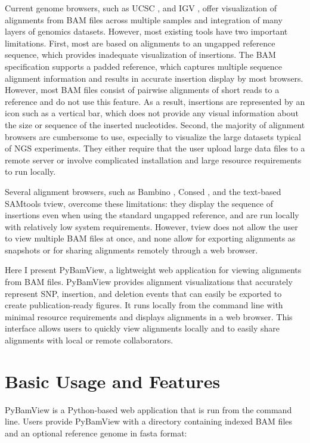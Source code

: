 Current genome browsers, such as UCSC \cite{Kent2002}, and IGV \cite{RobinsonThorvaldsdottirWincklerEtAl2011}, offer visualization of alignments from BAM files across multiple samples and integration of many layers of genomics datasets. However, most existing tools have two important limitations. First, most are based on alignments to an ungapped reference sequence, which provides inadequate visualization of insertions. The BAM specification supports a padded reference, which captures multiple sequence alignment information and results in accurate insertion display by most browsers. However, most BAM files consist of pairwise alignments of short reads to a reference and do not use this feature. As a result, insertions are represented by an icon such as a vertical bar, which does not provide any visual information about the size or sequence of the inserted nucleotides. Second, the majority of alignment browsers are cumbersome to use, especially to visualize the large datasets typical of NGS experiments. They either require that the user upload large data files to a remote server or involve complicated installation and large resource requirements to run locally. 

Several alignment browsers, such as Bambino \cite{EdmonsonZhangYanEtAl2011}, Consed \cite{GordonGreen2013}, and the text-based SAMtools \cite{LiHandsakerWysokerEtAl2009} tview, overcome these limitations: they display the sequence of insertions even when using the standard ungapped reference, and are run locally with relatively low system requirements. However, tview does not allow the user to view multiple BAM files at once, and none allow for exporting alignments as snapshots or for sharing alignments remotely through a web browser.

Here I present PyBamView, a lightweight web application for viewing alignments from BAM files. PyBamView provides alignment visualizations that accurately represent SNP, insertion, and deletion events that can easily be exported to create publication-ready figures. It runs locally from the command line with minimal resource requirements and displays alignments in a web browser. This interface allows users to quickly view alignments locally and to easily share alignments with local or remote collaborators.

\section{Basic Usage and Features}

PyBamView is a Python-based web application that is run from the command line. Users provide PyBamView with a directory containing indexed BAM files and an optional reference genome in fasta format:

